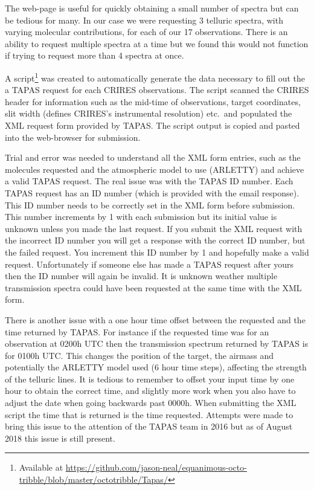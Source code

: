 The web-page is useful for quickly obtaining a small number of spectra but can be tedious for many. In our case we were requesting 3 telluric spectra, with varying molecular contributions, for each of our 17 observations. There is an ability to request multiple spectra at a time but we found this would not function if trying to request more than 4 spectra at once.

A script\footnote{Available at \href{https://github.com/jason-neal/equanimous-octo-tribble/blob/master/octotribble/Tapas/}{https://github.com/jason-neal/equanimous-octo-tribble/blob/master/octotribble/Tapas/}} was created to automatically generate the data necessary to fill out the a {TAPAS} request for each {CRIRES} observations. The script scanned the {CRIRES} header for information such as the mid-time of observations, target coordinates, slit width (defines {CRIRES}'s instrumental resolution) etc.\ and populated the {XML} request form provided by {TAPAS}. The script output is copied and pasted into the web-browser for submission.

Trial and error was needed to understand all the {XML} form entries, such as the molecules requested and the atmospheric model to use ({ARLETTY}) and achieve a valid {TAPAS} request. The real issue was with the {TAPAS} {{ID}} number. Each {TAPAS} request has an {ID} number (which is provided with the email response). This {ID} number needs to be correctly set in the {XML} form before submission. This number increments by 1 with each submission but its initial value is unknown unless you made the last request. If you submit the {XML} request with the incorrect {ID} number you will get a response with the correct {ID} number, but the failed request. You increment this {ID} number by 1 and hopefully make a valid request. Unfortunately if someone else has made a {TAPAS} request after yours then the {ID} number will again be invalid. It is unknown weather multiple transmission spectra could have been requested at the same time with the {XML} form.

There is another issue with a one hour time offset between the requested and the time returned by {TAPAS}. For instance if the requested time was for an observation at 0200h {UTC} then the transmission spectrum returned by {TAPAS} is for 0100h {UTC}. This changes the position of the target, the airmass and potentially the {ARLETTY} model used (6 hour time steps), affecting the strength of the telluric lines. It is tedious to remember to offset your input time by one hour to obtain the correct time, and slightly more work when you also have to adjust the date when going backwards past 0000h. When submitting the {XML} script the time that is returned is the time requested. Attempts were made to bring this issue to the attention of the {TAPAS} team in 2016 but as of August 2018 this issue is still present.

